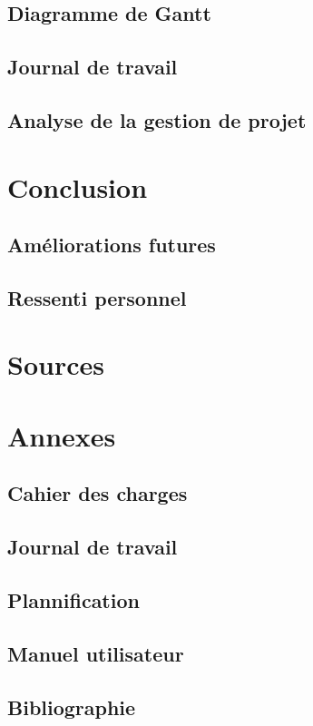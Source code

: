 \documentclass[a4paper,10pt,openany,oneside]{sphinxmanual}
\begin{document}
\section{Diagramme de Gantt}
\label{index:diagramme-de-gantt}

\section{Journal de travail}
\label{index:journal-de-travail}

\section{Analyse de la gestion de projet}
\label{index:analyse-de-la-gestion-de-projet}

\chapter{Conclusion}
\label{index:conclusion}

\section{Améliorations futures}
\label{index:ameliorations-futures}

\section{Ressenti personnel}
\label{index:ressenti-personnel}

\chapter{Sources}
\label{index:sources}

\chapter{Annexes}
\label{index:annexes}

\section{Cahier des charges}
\label{index:cahier-des-charges}

\section{Journal de travail}
\label{index:id13}

\section{Plannification}
\label{index:plannification}

\section{Manuel utilisateur}
\label{index:manuel-utilisateur}

\section{Bibliographie}
\label{index:bibliographie}


\renewcommand{\indexname}{Index}
\printindex
\end{document}
